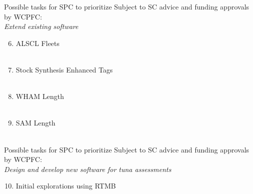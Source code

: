 \documentclass[aspectratio=169,fleqn]{beamer}
\begin{document}

\begin{frame}{Possible tasks for SPC to prioritize}
  Subject to SC advice and funding approvals by WCPFC:\\[3ex]
  {\orange\it Extend existing software}\\[1.5ex]
  \begin{enumerate}\setcounter{enumi}{5}
    \item ALSCL$\,$\raisebox{0.15ex}{+}$\,$Fleets\\
    \\[1.5ex]
    \item Stock Synthesis$\,$\raisebox{0.15ex}{+}$\,$Enhanced Tags\\
    \\[1.5ex]
    \item WHAM$\,$\raisebox{0.15ex}{+}$\,$Length\\
    \\[1.5ex]
    \item SAM$\,$\raisebox{0.15ex}{+}$\,$Length\\
    \\[1.5ex]
  \end{enumerate}
\end{frame}


\begin{frame}{Possible tasks for SPC to prioritize}
  Subject to SC advice and funding approvals by WCPFC:\\[4ex]
  {\orange\it Design and develop new software for tuna assessments}\\[2ex]
  \begin{enumerate}\setcounter{enumi}{9}
    \item Initial explorations using {\green RTMB}\\
  \end{enumerate}
\end{frame}
\end{document}
